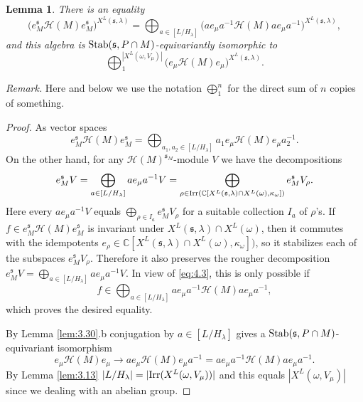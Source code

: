 \documentclass[11pt]{amsart}
\newtheorem{lem}[thm]{Lemma}
\theoremstyle{definition}
\begin{document}
\begin{lem}\label{lem:4.9}
There is an equality
\[
\big( e^{{\mathfrak s}}_M {{\mathcal H}} (M) e^{{\mathfrak s}}_M \big)^{X^L ({{\mathfrak s}},\lambda)} = 
\bigoplus\nolimits_{a \in [L / H_\lambda]} 
\big( a e_\mu a^{-1} {{\mathcal H}} (M) a e_\mu a^{-1} \big)^{X^L ({{\mathfrak s}},\lambda)} ,
\]
and this algebra is ${{\rm Stab}} ({{\mathfrak s}},P \cap M)$-equivariantly isomorphic to
\[
\bigoplus\nolimits_1^{|X^L (\omega,V_\mu)|} 
\big( e_\mu {{\mathcal H}} (M) e_\mu \big)^{X^L ({{\mathfrak s}},\lambda)} .
\]
\end{lem}
\emph{Remark.} Here and below we use the notation $\bigoplus_1^n$ for the direct
sum of $n$ copies of something.
\begin{proof}
As vector spaces 
\begin{equation}\label{eq:4.3}
e^{{\mathfrak s}}_M {{\mathcal H}} (M) e^{{\mathfrak s}}_M = \bigoplus\nolimits_{a_1,a_2 \in [L / H_\lambda]} 
a_1 e_\mu {{\mathcal H}} (M) e_\mu a_2^{-1} .
\end{equation}
On the other hand, for any ${{\mathcal H}} (M)^{{{\mathfrak s}}_M}$-module $V$ we have the decompositions
\begin{equation}\label{eq:4.33} 
e^{{\mathfrak s}}_M V = \bigoplus_{a \in [L / H_\lambda]} a e_{\mu } a^{-1} V =
\bigoplus_{\rho \in {{\rm Irr}} ({\mathbb C} [X^L ({{\mathfrak s}},\lambda) \cap X^L (\omega),\kappa_\omega])}
e^{{\mathfrak s}}_M V_\rho . 
\end{equation}
Here every $a e_\mu a^{-1} V$ equals $\bigoplus_{\rho \in I_a} e^{{\mathfrak s}}_M V_\rho$
for a suitable collection $I_a$ of $\rho$'s. If $f \in e^{{\mathfrak s}}_M {{\mathcal H}} (M) e^{{\mathfrak s}}_M$ is
invariant under $X^L ({{\mathfrak s}},\lambda) \cap X^L (\omega)$, then it commutes with the
idempotents $e_\rho \in {\mathbb C} [X^L ({{\mathfrak s}},\lambda) \cap X^L (\omega),\kappa_\omega])$,
so it stabilizes each of the subspaces $e^{{\mathfrak s}}_M V_\rho$. Therefore it also preserves 
the rougher decomposition $e^{{\mathfrak s}}_M V = \bigoplus_{a \in [L / H_\lambda]} 
a e_{\mu } a^{-1} V$. In view of \eqref{eq:4.3}, this is only possible if
\[
f \in \bigoplus\nolimits_{a \in [L / H_\lambda]} 
a e_\mu a^{-1} {{\mathcal H}} (M) a e_\mu a^{-1} ,
\] 
which proves the desired equality. 

By Lemma \ref{lem:3.30}.b conjugation by $a \in [L / H_\lambda]$ gives a 
${{\rm Stab}} ({{\mathfrak s}},P \cap M)$-equivariant isomorphism
\[
e_{\mu } {{\mathcal H}} (M) e_{\mu } \to a e_{\mu } {{\mathcal H}} (M) e_{\mu } a^{-1} =
a e_{\mu } a^{-1} {{\mathcal H}} (M) a e_{\mu } a^{-1} . 
\]
By Lemma \ref{lem:3.13} $|L / H_\lambda| = | {{\rm Irr}} (X^L (\omega,V_\mu)) |$ and
this equals $| X^L (\omega,V_\mu) |$ since we dealing with an abelian group.
\end{proof}
\end{document}
